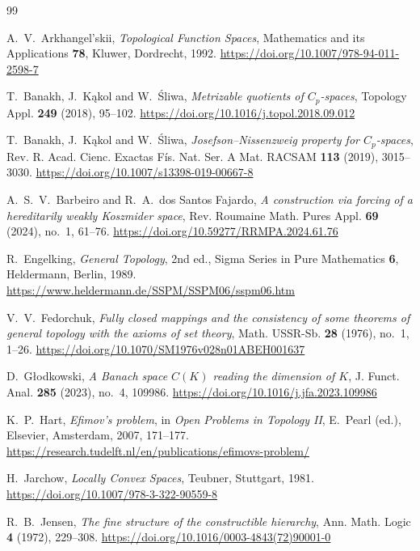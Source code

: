 \documentclass[a4paper,11pt]{amsart}
\theoremstyle{plain}
\theoremstyle{definition}
\theoremstyle{remark}
\numberwithin{equation}{section}
\begin{document}
\begin{thebibliography}{99}

A.~V.~Arkhangel'skii,
\emph{Topological Function Spaces},
Mathematics and its Applications \textbf{78}, Kluwer, Dordrecht, 1992.
\url{https://doi.org/10.1007/978-94-011-2598-7}

T.~Banakh, J.~K\k{a}kol and W.~\'Sliwa,
\emph{Metrizable quotients of $C_p$-spaces},
Topology Appl. \textbf{249} (2018), 95--102.
\url{https://doi.org/10.1016/j.topol.2018.09.012}

T.~Banakh, J.~K\k{a}kol and W.~\'Sliwa,
\emph{Josefson--Nissenzweig property for $C_p$-spaces},
Rev. R. Acad. Cienc. Exactas F\'{i}s. Nat. Ser. A Mat. RACSAM
\textbf{113} (2019), 3015--3030.
\url{https://doi.org/10.1007/s13398-019-00667-8}

A.~S.~V.~Barbeiro and R.~A.~dos Santos Fajardo,
\emph{A construction via forcing of a hereditarily weakly Koszmider space},
Rev. Roumaine Math. Pures Appl. \textbf{69} (2024), no.~1, 61--76.
\url{https://doi.org/10.59277/RRMPA.2024.61.76}

R.~Engelking,
\emph{General Topology}, 2nd ed., Sigma Series in Pure Mathematics
\textbf{6}, Heldermann, Berlin, 1989.
\url{https://www.heldermann.de/SSPM/SSPM06/sspm06.htm}

V.~V.~Fedorchuk,
\emph{Fully closed mappings and the consistency of some theorems of general topology with the axioms of set theory},
Math. USSR-Sb. \textbf{28} (1976), no.~1, 1--26.
\url{https://doi.org/10.1070/SM1976v028n01ABEH001637}

D.~G{\l}odkowski,
\emph{A Banach space $C(K)$ reading the dimension of $K$},
J. Funct. Anal. \textbf{285} (2023), no.~4, 109986.
\url{https://doi.org/10.1016/j.jfa.2023.109986}

K.~P.~Hart,
\emph{Efimov's problem}, in \emph{Open Problems in Topology II},
E.~Pearl (ed.), Elsevier, Amsterdam, 2007, 171--177.
\url{https://research.tudelft.nl/en/publications/efimovs-problem/}

H.~Jarchow,
\emph{Locally Convex Spaces}, Teubner, Stuttgart, 1981.
\url{https://doi.org/10.1007/978-3-322-90559-8}

R.~B.~Jensen,
\emph{The fine structure of the constructible hierarchy},
Ann. Math. Logic \textbf{4} (1972), 229--308.
\url{https://doi.org/10.1016/0003-4843(72)90001-0}


\end{thebibliography}
\end{document}
